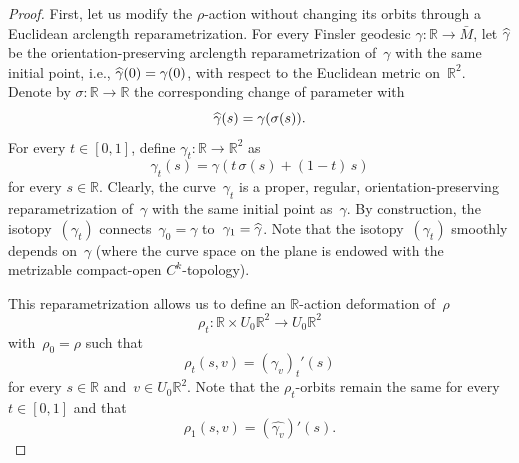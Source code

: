 \documentclass[AHL,Unicode,longabstracts,published]{cedram}
\newcommand{\R}{\mathbb{R}}
\newcommand{\T}{\mathbb{T}}
\newcommand{\ie}{i.e.}
\let\oldhat\hat
\renewcommand*{\hat}[1]{\mathchoice{\widehat{#1}}{\widehat{#1}}{\oldhat{#1}}{\oldhat{#1}}}
\begin{document}
\begin{proof}

First, let us modify the $\rho$-action without changing its orbits through a Euclidean arclength reparametrization. For every Finsler geodesic \mbox{$\gamma:\R \to \bar{M}$}, let $\hat{\gamma}$ be the orientation-preserving arclength reparametrization of~$\gamma$ with the same initial point, \ie, $\hat{\gamma}(0)=\gamma(0)$, with respect to the Euclidean metric on~$\R^2$. Denote by $\sigma:\R \to \R$ the corresponding change of parameter with
\[
\hat{\gamma}(s) = \gamma(\sigma(s)).
\]
For every $t \in [0,1]$, define $\gamma_t:\R \to \R^2$ as
\[
\gamma_t(s) = \gamma(t \, \sigma(s) + (1-t) \, s)
\]
for every $s \in \R$. Clearly, the curve~$\gamma_t$ is a proper, regular, orientation-preserving reparametrization of~$\gamma$ with the same initial point as~$\gamma$. By construction, the isotopy~$(\gamma_t)$ connects~$\gamma_0 = \gamma$ to~$\gamma_1 = \hat{\gamma}$. Note that the isotopy~$(\gamma_t)$ smoothly depends on~$\gamma$ (where the curve space on the plane is endowed with the metrizable compact-open $C^{k}$-topology). 

This reparametrization allows us to define an $\R$-action deformation of~$\rho$
\[
\rho_t:\R \times U_0\R^2 \to U_0\R^2
\]
with~$\rho_0=\rho$ such that
\[
\rho_t(s,v) = (\gamma_v)_t'(s)
\]
for every $s \in \R$ and~$v \in U_0\R^2$. Note that the $\rho_t$-orbits remain the same for every $t \in [0,1]$ and that
\[
\rho_1(s,v) = (\widehat{\gamma_v})'(s).
\]


\end{proof}
\end{document}

